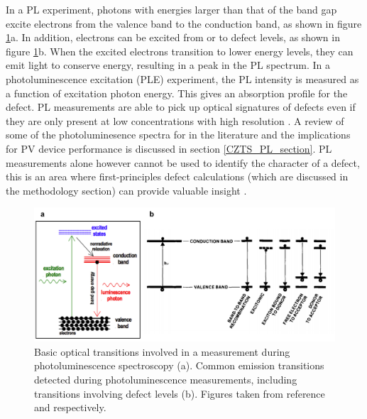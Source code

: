 In a PL experiment, photons with energies larger than that of the band gap excite electrons from the valence band to the conduction band, as shown in figure \ref{PL_transitions}a. In addition, electrons can be excited from or to defect levels, as shown in figure \ref{PL_transitions}b. When the excited electrons transition to lower energy levels, they can emit light to conserve energy, resulting in a peak in the PL spectrum. In a photoluminescence excitation (PLE) experiment, the PL intensity is measured as a function of excitation photon energy. This gives an absorption profile for the defect. PL measurements are able to pick up optical signatures of defects even if they are only present at low concentrations with high resolution \cite{defects_tutorial}. A review of some of the photoluminesence spectra for {\CZTS} in the literature and the implications for PV device performance is discussed in section \ref{CZTS_PL_section}. PL measurements alone however cannot be used to identify the character of a defect, this is an area where first-principles defect calculations (which are discussed in the methodology section) can provide valuable insight \cite{defects_tutorial}.

\begin{figure}[h!]
  \centering
    \includegraphics[width=1.0\textwidth]{figures/PL_transitions.png}
    \caption{Basic optical transitions involved in a measurement during photoluminescence spectroscopy (a). Common emission transitions detected during photoluminescence measurements, including transitions involving defect levels (b). Figures taken from reference \citenum{} and  respectively.}
  \label{PL_transitions}
\end{figure}

